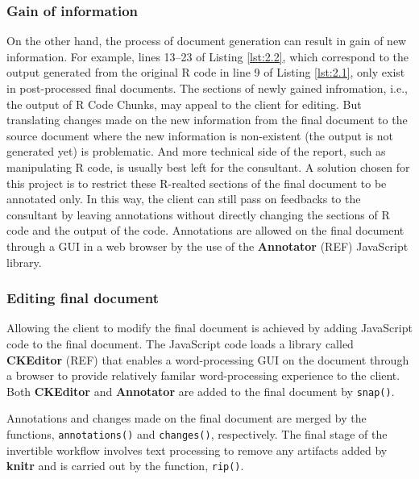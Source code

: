 \documentclass[a4paper, 12pt]{report}
\begin{document}
\subsubsection*{Gain of information}
On the other hand, the process of document generation can result in gain of new information. For example, lines 13--23 of Listing \ref{lst:2.2}, which correspond to the output generated from the original R code in line 9 of Listing \ref{lst:2.1}, only exist in post-processed final documents. The sections of newly gained infromation, i.e., the output of R Code Chunks, may appeal to the client for editing. But translating changes made on the new information from the final document to the source document where the new information is non-existent (the output is not generated yet) is problematic. And more technical side of the report, such as manipulating R code, is usually best left for the consultant. A solution chosen for this project is to restrict these R-realted sections of the final document to be annotated only. In this way, the client can still pass on feedbacks to the consultant by leaving annotations without directly changing the sections of R code and the output of the code. Annotations are allowed on the final document through a GUI in a web browser by the use of the \textbf{Annotator} (REF) JavaScript library.

\subsubsection*{Editing final document}
Allowing the client to modify the final document is achieved by adding JavaScript code to the final document. The JavaScript code loads a library called \textbf{CKEditor} (REF) that enables a word-processing GUI on the document through a browser to provide relatively familar word-processing experience to the client. Both \textbf{CKEditor} and \textbf{Annotator} are added to the final document by \texttt{snap()}.

Annotations and changes made on the final document are merged by the functions, \texttt{annotations()} and \texttt{changes()}, respectively. The final stage of the invertible workflow involves text processing to remove any artifacts added by \textbf{knitr} and is carried out by the function, \texttt{rip()}.
\end{document}
